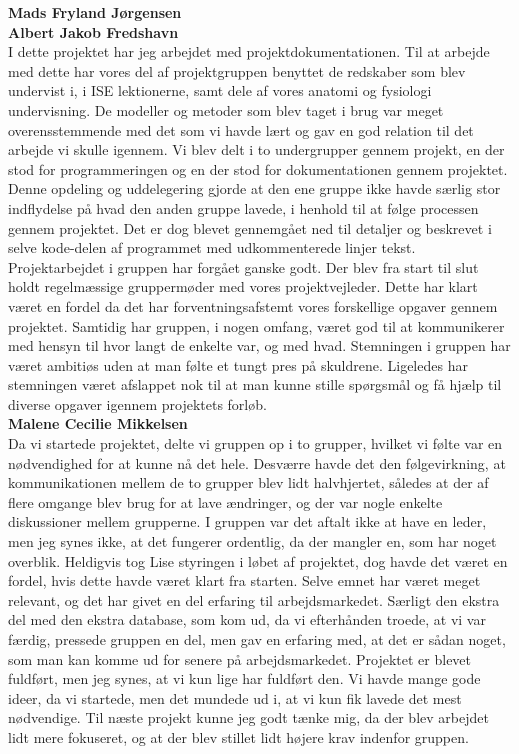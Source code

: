\textbf{Mads Fryland Jørgensen}\\

\textbf{Albert Jakob Fredshavn}\\
I dette projektet har jeg arbejdet med projektdokumentationen. Til at arbejde med dette har vores del af projektgruppen benyttet de redskaber som blev undervist i, i ISE lektionerne, samt dele af vores anatomi og fysiologi undervisning. De modeller og metoder som blev taget i brug var meget overensstemmende med det som vi havde lært og gav en god relation til det arbejde vi skulle igennem. Vi blev delt i to undergrupper gennem projekt, en der stod for programmeringen og en der stod for dokumentationen gennem projektet. Denne opdeling og uddelegering gjorde at den ene gruppe ikke havde særlig stor indflydelse på hvad den anden gruppe lavede, i henhold til at følge processen gennem projektet. Det er dog blevet gennemgået ned til detaljer og beskrevet i selve kode-delen af programmet med udkommenterede linjer tekst. \\
Projektarbejdet i gruppen har forgået ganske godt. Der blev fra start til slut holdt regelmæssige gruppermøder med vores projektvejleder. Dette har klart været en fordel da det har forventningsafstemt vores forskellige opgaver gennem projektet. Samtidig har gruppen, i nogen omfang, været god til at kommunikerer med hensyn til hvor langt de enkelte var, og med hvad. Stemningen i gruppen har været ambitiøs uden at man følte et tungt pres på skuldrene. Ligeledes har stemningen været afslappet nok til at man kunne stille spørgsmål og få hjælp til diverse opgaver igennem projektets forløb.\\

\textbf{Malene Cecilie Mikkelsen}\\
Da vi startede projektet, delte vi gruppen op i to grupper, hvilket vi følte var en nødvendighed for at kunne nå det hele. Desværre havde det den følgevirkning, at kommunikationen mellem de to grupper blev lidt halvhjertet, således at der af flere omgange blev brug for at lave ændringer, og der var nogle enkelte diskussioner mellem grupperne. I gruppen var det aftalt ikke at have en leder, men jeg synes ikke, at det fungerer ordentlig, da der mangler en, som har noget overblik. Heldigvis tog Lise styringen i løbet af projektet, dog havde det været en fordel, hvis dette havde været klart fra starten. 
Selve emnet har været meget relevant, og det har givet en del erfaring til arbejdsmarkedet. Særligt den ekstra del med den ekstra database, som kom ud, da vi efterhånden troede, at vi var færdig, pressede gruppen en del, men gav en erfaring med, at det er sådan noget, som man kan komme ud for senere på arbejdsmarkedet.
Projektet er blevet fuldført, men jeg synes, at vi kun lige har fuldført den. Vi havde mange gode ideer, da vi startede, men det mundede ud i, at vi kun fik lavede det mest nødvendige. Til næste projekt kunne jeg godt tænke mig, da der blev arbejdet lidt mere fokuseret, og at der blev stillet lidt højere krav indenfor gruppen.

